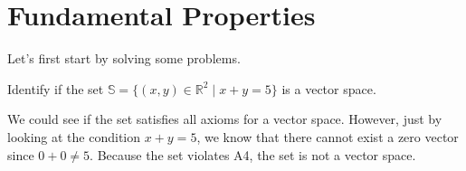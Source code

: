 \documentclass[../../main.tex]{subfiles}
\begin{document}
\section{Fundamental Properties}

Let's first start by solving some problems.

\begin{problem}{}{}
Identify if the set $\mathbb{S} = \{ (x, y) \in \mathbb{R}^2 \mid
x + y = 5 \}$ is a vector space.
\end{problem}
\begin{solution}
We could see if the set satisfies all axioms for a vector space.
However, just by looking at the condition $x + y = 5$, we know that
there cannot exist a zero vector since $0 + 0 \neq 5$. Because the
set violates A4, the set is not a vector space.
\end{solution}
\end{document}
